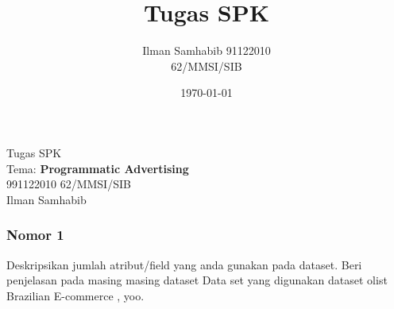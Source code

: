 \documentclass{article}
\title{Tugas SPK}
\author{Ilman Samhabib 91122010\\62/MMSI/SIB}
\date{\today}
\begin{document}
\begin{center}
    Tugas SPK
    \\ Tema: \textbf{Programmatic Advertising} 
    \\ 991122010 62/MMSI/SIB
    \\ Ilman Samhabib
\end{center}

\subsubsection*{Nomor 1}
Deskripsikan jumlah atribut/field 
yang anda gunakan pada dataset. Beri penjelasan pada masing masing dataset
\bigbreak
Data set yang digunakan dataset olist Brazilian E-commerce \cite{Olist_2018}, yoo.




\end{document}
